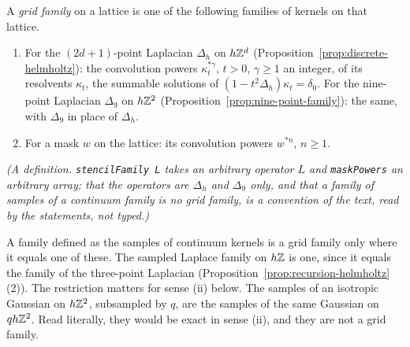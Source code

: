 \begin{definition}
\label{def:grid-family}
\leanok
{}
A \emph{grid family} on a lattice is one of the following families of kernels on that lattice.
\begin{enumerate}
\item For the $(2d+1)$-point Laplacian $\Delta_h$ on $h\mathbb{Z}^d$
(Proposition~\ref{prop:discrete-helmholtz}): the convolution powers $\kappa_t^{*\gamma}$, $t > 0$,
$\gamma \ge 1$ an integer, of its resolvents $\kappa_t$, the summable solutions of
$(1 - t^2\Delta_h)\kappa_t = \delta_0$. For the nine-point Laplacian $\Delta_9$ on $h\mathbb{Z}^2$
(Proposition~\ref{prop:nine-point-family}): the same, with $\Delta_9$ in place of $\Delta_h$.
\item For a mask $w$ on the lattice: its convolution powers $w^{*n}$, $n \ge 1$.
\end{enumerate}
\statusT\quad\emph{(A definition. \texttt{stencilFamily L} takes an arbitrary operator $L$ and
\texttt{maskPowers} an arbitrary array; that the operators are $\Delta_h$ and $\Delta_9$ only, and that
a family of samples of a continuum family is no grid family, is a convention of the text, read by
the statements, not typed.)}
\end{definition}

A family defined as the samples of continuum kernels is a grid family only where it equals one of
these. The sampled Laplace family on $h\mathbb{Z}$ is one, since it equals the family of the three-point
Laplacian (Proposition~\ref{prop:recursion-helmholtz}(2)). The restriction matters for sense (ii)
below. The samples of an isotropic Gaussian on $h\mathbb{Z}^2$, subsampled by $q$, are the samples of the
same Gaussian on $qh\mathbb{Z}^2$. Read literally, they would be exact in sense (ii), and they are not a
grid family.

